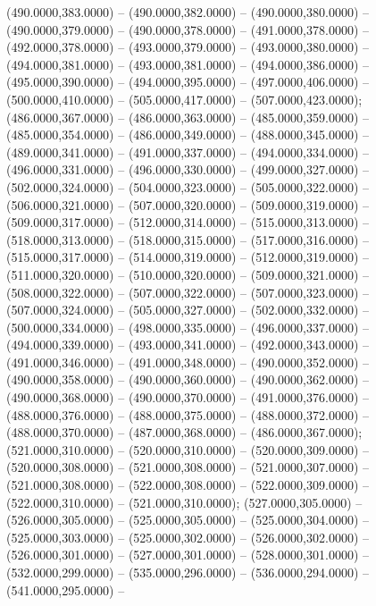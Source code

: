 \begin{scope}[shift={(-231.87,-121.87)}]
\begin{scope}[draw=black,fill=cffffbf,line join=round,line width=0.208pt]
        (490.0000,383.0000) -- (490.0000,382.0000) -- (490.0000,380.0000) --
        (490.0000,379.0000) -- (490.0000,378.0000) -- (491.0000,378.0000) --
        (492.0000,378.0000) -- (493.0000,379.0000) -- (493.0000,380.0000) --
        (494.0000,381.0000) -- (493.0000,381.0000) -- (494.0000,386.0000) --
        (495.0000,390.0000) -- (494.0000,395.0000) -- (497.0000,406.0000) --
        (500.0000,410.0000) -- (505.0000,417.0000) -- (507.0000,423.0000);
       (486.0000,367.0000) -- (486.0000,363.0000) --
        (485.0000,359.0000) -- (485.0000,354.0000) -- (486.0000,349.0000) --
        (488.0000,345.0000) -- (489.0000,341.0000) -- (491.0000,337.0000) --
        (494.0000,334.0000) -- (496.0000,331.0000) -- (496.0000,330.0000) --
        (499.0000,327.0000) -- (502.0000,324.0000) -- (504.0000,323.0000) --
        (505.0000,322.0000) -- (506.0000,321.0000) -- (507.0000,320.0000) --
        (509.0000,319.0000) -- (509.0000,317.0000) -- (512.0000,314.0000) --
        (515.0000,313.0000) -- (518.0000,313.0000) -- (518.0000,315.0000) --
        (517.0000,316.0000) -- (515.0000,317.0000) -- (514.0000,319.0000) --
        (512.0000,319.0000) -- (511.0000,320.0000) -- (510.0000,320.0000) --
        (509.0000,321.0000) -- (508.0000,322.0000) -- (507.0000,322.0000) --
        (507.0000,323.0000) -- (507.0000,324.0000) -- (505.0000,327.0000) --
        (502.0000,332.0000) -- (500.0000,334.0000) -- (498.0000,335.0000) --
        (496.0000,337.0000) -- (494.0000,339.0000) -- (493.0000,341.0000) --
        (492.0000,343.0000) -- (491.0000,346.0000) -- (491.0000,348.0000) --
        (490.0000,352.0000) -- (490.0000,358.0000) -- (490.0000,360.0000) --
        (490.0000,362.0000) -- (490.0000,368.0000) -- (490.0000,370.0000) --
        (491.0000,376.0000) -- (488.0000,376.0000) -- (488.0000,375.0000) --
        (488.0000,372.0000) -- (488.0000,370.0000) -- (487.0000,368.0000) --
        (486.0000,367.0000);
       (521.0000,310.0000) -- (520.0000,310.0000) --
        (520.0000,309.0000) -- (520.0000,308.0000) -- (521.0000,308.0000) --
        (521.0000,307.0000) -- (521.0000,308.0000) -- (522.0000,308.0000) --
        (522.0000,309.0000) -- (522.0000,310.0000) -- (521.0000,310.0000);
       (527.0000,305.0000) -- (526.0000,305.0000) --
        (525.0000,305.0000) -- (525.0000,304.0000) -- (525.0000,303.0000) --
        (525.0000,302.0000) -- (526.0000,302.0000) -- (526.0000,301.0000) --
        (527.0000,301.0000) -- (528.0000,301.0000) -- (532.0000,299.0000) --
        (535.0000,296.0000) -- (536.0000,294.0000) -- (541.0000,295.0000) --

\end{scope}
\end{scope}
